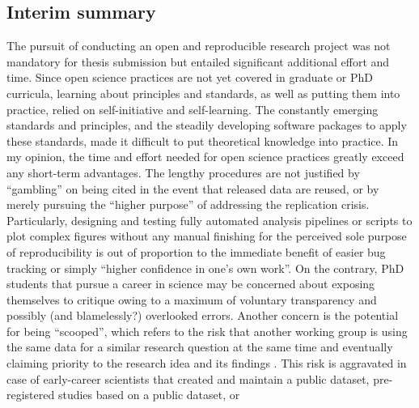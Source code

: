 \subsection{Interim summary}



%
The pursuit of conducting an open and reproducible research project was not
mandatory for thesis submission but entailed significant additional effort and
time.
%
Since open science practices are not yet covered in graduate or PhD curricula,
learning about principles and standards, as well as putting them into practice,
relied on self-initiative and self-learning.
%
The constantly emerging standards and principles, and the steadily developing
software packages to apply these standards, made it difficult to put theoretical
knowledge into practice.
%
In my opinion, the time and effort needed for open science practices greatly
exceed any short-term advantages.
%
The lengthy procedures are not justified by ``gambling'' on being cited in the
event that released data are reused, or by merely pursuing the ``higher
purpose'' of addressing the replication crisis.
%
Particularly, designing and testing fully automated analysis pipelines or
scripts to plot complex figures without any manual finishing for the perceived
sole purpose of reproducibility is out of proportion to the immediate benefit of
easier bug tracking or simply ``higher confidence in one's own work''.
%
On the contrary, PhD students that pursue a career in science may be concerned
about exposing themselves to critique owing to a maximum of voluntary
transparency and possibly (and blamelessly?) overlooked errors.
%
Another concern is the potential for being ``scooped'', which refers to the risk
that another working group is using the same data for a similar research
question at the same time and eventually claiming priority to the research idea
and its findings \citep[cf.][]{laine2017afraid}.
%
This risk is aggravated in case of early-career scientists that created and
maintain a public dataset, pre-registered studies based on a public dataset, or
